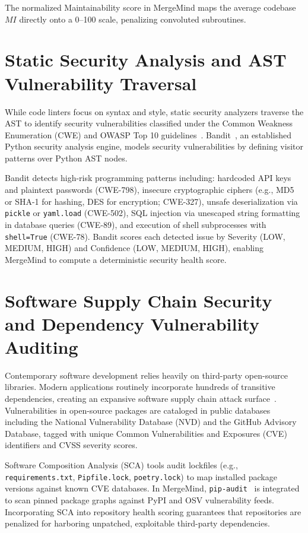 The normalized Maintainability score in MergeMind maps the average codebase $MI$ directly onto a 0--100 scale, penalizing convoluted subroutines.

\section{Static Security Analysis and AST Vulnerability Traversal}
\label{sec:lit-security-sast}

While code linters focus on syntax and style, static security analyzers traverse the AST to identify security vulnerabilities classified under the Common Weakness Enumeration (CWE) and OWASP Top 10 guidelines~\cite{owasp2021top10}. Bandit~\cite{sembiring2022implementation,paul2021survey}, an established Python security analysis engine, models security vulnerabilities by defining visitor patterns over Python AST nodes.

Bandit detects high-risk programming patterns including: hardcoded API keys and plaintext passwords (CWE-798), insecure cryptographic ciphers (e.g., MD5 or SHA-1 for hashing, DES for encryption; CWE-327), unsafe deserialization via \texttt{pickle} or \texttt{yaml.load} (CWE-502), SQL injection via unescaped string formatting in database queries (CWE-89), and execution of shell subprocesses with \texttt{shell=True} (CWE-78). Bandit scores each detected issue by Severity (LOW, MEDIUM, HIGH) and Confidence (LOW, MEDIUM, HIGH), enabling MergeMind to compute a deterministic security health score.

\section{Software Supply Chain Security and Dependency Vulnerability Auditing}
\label{sec:lit-supply-chain}

Contemporary software development relies heavily on third-party open-source libraries. Modern applications routinely incorporate hundreds of transitive dependencies, creating an expansive software supply chain attack surface~\cite{srikant2022software}. Vulnerabilities in open-source packages are cataloged in public databases including the National Vulnerability Database (NVD) and the GitHub Advisory Database, tagged with unique Common Vulnerabilities and Exposures (CVE) identifiers and CVSS severity scores.

Software Composition Analysis (SCA) tools audit lockfiles (e.g., \texttt{requirements.txt}, \texttt{Pipfile.lock}, \texttt{poetry.lock}) to map installed package versions against known CVE databases. In MergeMind, \texttt{pip-audit}~\cite{trailofbits2024pipaudit} is integrated to scan pinned package graphs against PyPI and OSV vulnerability feeds. Incorporating SCA into repository health scoring guarantees that repositories are penalized for harboring unpatched, exploitable third-party dependencies.


